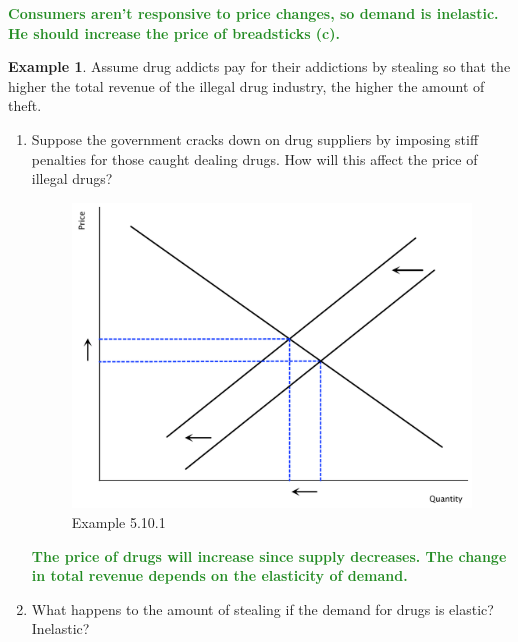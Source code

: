 \documentclass[11pt]{article}\usepackage[]{graphicx}\usepackage[]{color}
\theoremstyle{definition}
\newtheorem{exmp}{Example}[section]
\newcommand{\ddp}[1]{{\textbf{\textcolor{ForestGreen}{#1}}}}
\begin{document}
	\ddp{Consumers aren't responsive to price changes, so demand is inelastic. He should increase the price of breadsticks (c).}

	\begin{exmp} 
		
		Assume drug addicts pay for their addictions by stealing so that the higher the total revenue of the illegal drug industry, the higher the amount of theft.
		
		\begin{enumerate}
			\item Suppose the government cracks down on drug suppliers by imposing stiff penalties for those caught dealing drugs. How will this affect the price of illegal drugs?
			
				\begin{figure}[H]
					\centering
					\includegraphics[scale=.35]{plot30.pdf}
					\caption{Example 5.10.1}
				\end{figure}
				
			\ddp{The price of drugs will increase since supply decreases. The change in total revenue depends on the elasticity of demand.}
				
			\item What happens to the amount of stealing if the demand for drugs is elastic? Inelastic?
			

\end{enumerate}
\end{exmp}
\end{document}
